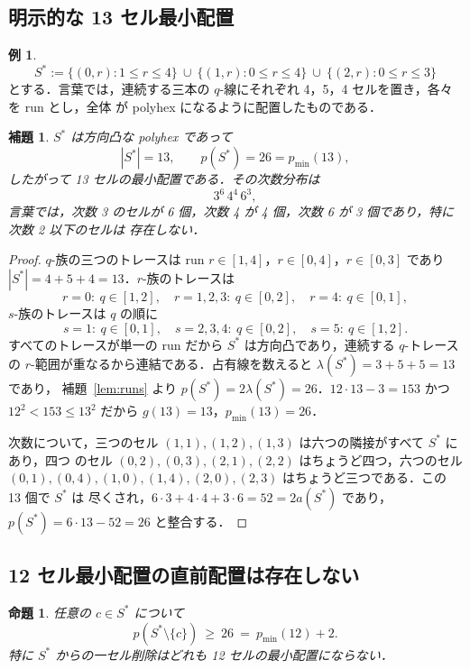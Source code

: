 \documentclass[11pt]{article}
\theoremstyle{plain}
\newtheorem{lemma}[theorem]{補題}
\newtheorem{proposition}[theorem]{命題}
\theoremstyle{definition}
\newtheorem{example}[theorem]{例}
\theoremstyle{remark}
\newcommand{\sm}{\setminus}
\begin{document}
\subsection{明示的な 13 セル最小配置}\label{sec:8.2}

\begin{example}\label{ex:13}
\[
   S^{\ast}:=\{(0,r):1\le r\le4\}\ \cup\ \{(1,r):0\le r\le4\}\ \cup\ \{(2,r):0\le r\le3\}
\]
とする．言葉では，連続する三本の \(q\)-線にそれぞれ 4，5，4 セルを置き，各々を run とし，全体
が polyhex になるように配置したものである．
\end{example}

\begin{lemma}\label{lem:13min}
\(S^{\ast}\) は方向凸な polyhex であって
\[
   |S^{\ast}|=13,\qquad p(S^{\ast})=26=p_{\min}(13),
\]
したがって 13 セルの最小配置である．その次数分布は
\[
   3^{6}\,4^{4}\,6^{3},
\]
言葉では，次数 3 のセルが 6 個，次数 4 が 4 個，次数 6 が 3 個であり，特に次数 2 以下のセルは
存在しない．
\end{lemma}

\begin{proof}
\(q\)-族の三つのトレースは run \(r\in[1,4]\)，\(r\in[0,4]\)，\(r\in[0,3]\) であり
\(|S^{\ast}|=4+5+4=13\)．\(r\)-族のトレースは
\[
   r=0:\ q\in[1,2],\quad r=1,2,3:\ q\in[0,2],\quad r=4:\ q\in[0,1],
\]
\(s\)-族のトレースは \(q\) の順に
\[
   s=1:\ q\in[0,1],\quad s=2,3,4:\ q\in[0,2],\quad s=5:\ q\in[1,2].
\]
すべてのトレースが単一の run だから \(S^{\ast}\) は方向凸であり，連続する \(q\)-トレースの
\(r\)-範囲が重なるから連結である．占有線を数えると \(\lambda(S^{\ast})=3+5+5=13\) であり，
補題~\ref{lem:runs} より \(p(S^{\ast})=2\lambda(S^{\ast})=26\)．\(12\cdot13-3=153\) かつ
\(12^{2}<153\le13^{2}\) だから \(g(13)=13\)，\(p_{\min}(13)=26\)．

次数について，三つのセル \((1,1),(1,2),(1,3)\) は六つの隣接がすべて \(S^{\ast}\) にあり，四つ
のセル \((0,2),(0,3),(2,1),(2,2)\) はちょうど四つ，六つのセル
\((0,1),(0,4),(1,0),(1,4),(2,0),(2,3)\) はちょうど三つである．この 13 個で \(S^{\ast}\) は
尽くされ，\(6\cdot3+4\cdot4+3\cdot6=52=2a(S^{\ast})\) であり，
\(p(S^{\ast})=6\cdot13-52=26\) と整合する．
\end{proof}

\subsection{12 セル最小配置の直前配置は存在しない}\label{sec:8.3}

\begin{proposition}\label{pro:nopred}
任意の \(c\in S^{\ast}\) について
\[
   p(S^{\ast}\sm\{c\})\ \ge\ 26\ =\ p_{\min}(12)+2 .
\]
特に \(S^{\ast}\) からの一セル削除はどれも 12 セルの最小配置にならない．
\end{proposition}
\end{document}
